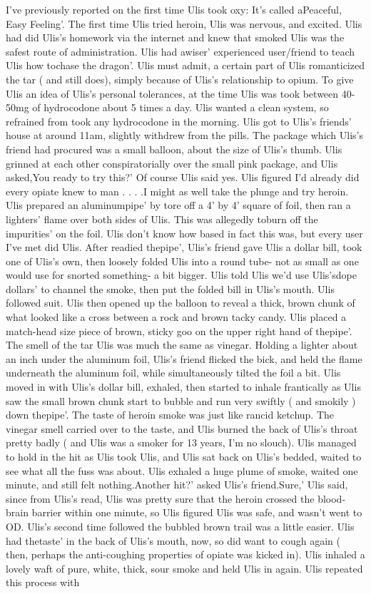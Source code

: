 \documentclass[12pt]{book}
\begin{document}
I've previously reported on the first time Ulis took oxy: It's called aPeaceful, Easy Feeling'. The first time Ulis tried heroin, Ulis was nervous, and excited. Ulis had did Ulis's homework via the internet and knew that smoked Ulis was the safest route of administration. Ulis had awiser' experienced user/friend to teach Ulis how tochase the dragon'. Ulis must admit, a certain part of Ulis romanticized the tar ( and still does), simply because of Ulis's relationship to opium. To give Ulis an idea of Ulis's personal tolerances, at the time Ulis was took between 40-50mg of hydrocodone about 5 times a day. Ulis wanted a clean system, so refrained from took any hydrocodone in the morning. Ulis got to Ulis's friends' house at around 11am, slightly withdrew from the pills. The package which Ulis's friend had procured was a small balloon, about the size of Ulis's thumb. Ulis grinned at each other conspiratorially over the small pink package, and Ulis asked,You ready to try this?' Of course Ulis said yes. Ulis figured I'd already did every opiate knew to man . . .  .I might as well take the plunge and try heroin. Ulis prepared an aluminumpipe' by tore off a 4' by 4' square of foil, then ran a lighters' flame over both sides of Ulis. This was allegedly toburn off the impurities' on the foil. Ulis don't know how based in fact this was, but every user I've met did Ulis. After readied thepipe', Ulis's friend gave Ulis a dollar bill, took one of Ulis's own, then loosely folded Ulis into a round tube- not as small as one would use for snorted something- a bit bigger. Ulis told Ulis we'd use Ulis'sdope dollars' to channel the smoke, then put the folded bill in Ulis's mouth. Ulis followed suit. Ulis then opened up the balloon to reveal a thick, brown chunk of what looked like a cross between a rock and brown tacky candy. Ulis placed a match-head size piece of brown, sticky goo on the upper right hand of thepipe'. The smell of the tar Ulis was much the same as vinegar. Holding a lighter about an inch under the aluminum foil, Ulis's friend flicked the bick, and held the flame underneath the aluminum foil, while simultaneously tilted the foil a bit. Ulis moved in with Ulis's dollar bill, exhaled, then started to inhale frantically as Ulis saw the small brown chunk start to bubble and run very swiftly ( and smokily ) down thepipe'. The taste of heroin smoke was just like rancid ketchup. The vinegar smell carried over to the taste, and Ulis burned the back of Ulis's throat pretty badly ( and Ulis was a smoker for 13 years, I'm no slouch). Ulis managed to hold in the hit as Ulis took Ulis, and Ulis sat back on Ulis's bedded, waited to see what all the fuss was about. Ulis exhaled a huge plume of smoke, waited one minute, and still felt nothing.Another hit?' asked Ulis's friend.Sure,' Ulis said, since from Ulis's read, Ulis was pretty sure that the heroin crossed the blood-brain barrier within one minute, so Ulis figured Ulis was safe, and wasn't went to OD. Ulis's second time followed the bubbled brown trail was a little easier. Ulis had thetaste' in the back of Ulis's mouth, now, so did want to cough again ( then, perhaps the anti-coughing properties of opiate was kicked in). Ulis inhaled a lovely waft of pure, white, thick, sour smoke and held Ulis in again. Ulis repeated this process with 
\end{document}
